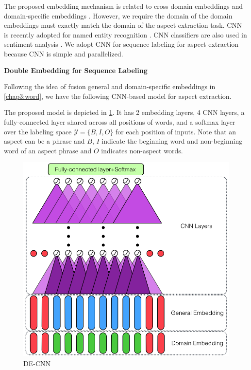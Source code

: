 The proposed embedding mechanism is related to cross domain embeddings \cite{bollegala2015unsupervised,bollegala2017think} and domain-specific embeddings \cite{xumeta,Xu2018pro}. 
However, we require the domain of the domain embeddings must exactly match the domain of the aspect extraction task. 
CNN \cite{lecun1995convolutional,kim2014convolutional} is recently adopted for named entity recognition \cite{strubell2017fast}.
CNN classifiers are also used in sentiment analysis \cite{poria2016aspect,chen2017improving}.
We adopt CNN for sequence labeling for aspect extraction because CNN is simple and parallelized.

\textbf{Double Embedding for Sequence Labeling}

Following the idea of fusion general and domain-specific embeddings in \ref{chap3:word}, we have the following CNN-based model for aspect extraction.

The proposed model is depicted in \ref{chap6:fig:fr}.
It has 2 embedding layers, 4 CNN layers, a fully-connected layer shared across all positions of words, and a softmax layer over the labeling space $\mathcal{Y}=\{B, I, O\}$ for each position of inputs.
Note that an aspect can be a phrase and $B$, $I$ indicate the beginning word and non-beginning word of an aspect phrase and $O$ indicates non-aspect words.

\begin{figure}[H]
\centering    
\includegraphics[width=5.in]{fig/acl18_fig.png}
    \caption{DE-CNN}
    \label{chap6:fig:fr}
\end{figure}

